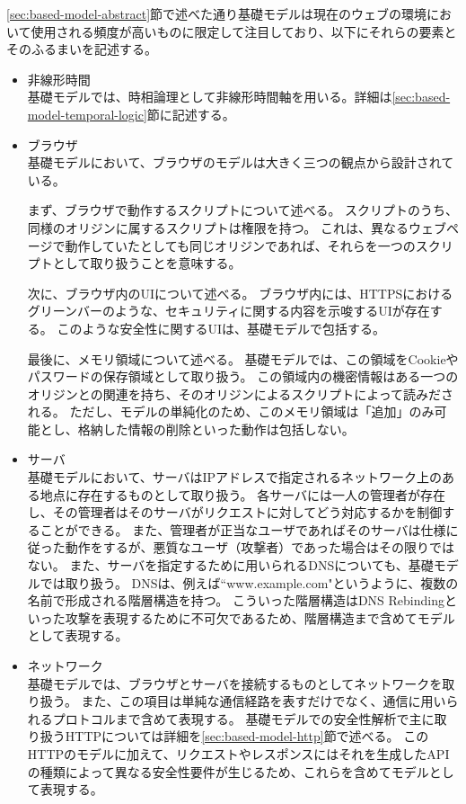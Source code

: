 \documentclass[12pt,a4paper]{jbook}
\begin{document}
\ref{sec:based-model-abstract}節で述べた通り基礎モデルは現在のウェブの環境において使用される頻度が高いものに限定して注目しており、以下にそれらの要素とそのふるまいを記述する。
\color{red}
\begin{itemize}
\item 非線形時間 \\
基礎モデルでは、時相論理として非線形時間軸を用いる。詳細は\ref{sec:based-model-temporal-logic}節に記述する。
\item ブラウザ \\
基礎モデルにおいて、ブラウザのモデルは大きく三つの観点から設計されている。

まず、ブラウザで動作するスクリプトについて述べる。
スクリプトのうち、同様のオリジンに属するスクリプトは権限を持つ。
これは、異なるウェブページで動作していたとしても同じオリジンであれば、それらを一つのスクリプトとして取り扱うことを意味する。

次に、ブラウザ内のUIについて述べる。
ブラウザ内には、HTTPSにおけるグリーンバーのような、セキュリティに関する内容を示唆するUIが存在する。
このような安全性に関するUIは、基礎モデルで包括する。

最後に、メモリ領域について述べる。
基礎モデルでは、この領域をCookieやパスワードの保存領域として取り扱う。
この領域内の機密情報はある一つのオリジンとの関連を持ち、そのオリジンによるスクリプトによって読みだされる。
ただし、モデルの単純化のため、このメモリ領域は「追加」のみ可能とし、格納した情報の削除といった動作は包括しない。
\item サーバ \\
基礎モデルにおいて、サーバはIPアドレスで指定されるネットワーク上のある地点に存在するものとして取り扱う。
各サーバには一人の管理者が存在し、その管理者はそのサーバがリクエストに対してどう対応するかを制御することができる。
また、管理者が正当なユーザであればそのサーバは仕様に従った動作をするが、悪質なユーザ（攻撃者）であった場合はその限りではない。
また、サーバを指定するために用いられるDNSについても、基礎モデルでは取り扱う。
DNSは、例えば``www.example.com"というように、複数の名前で形成される階層構造を持つ。
こういった階層構造はDNS Rebinding\cite{dns-rebinding}といった攻撃を表現するために不可欠であるため、階層構造まで含めてモデルとして表現する。
\item ネットワーク \\
基礎モデルでは、ブラウザとサーバを接続するものとしてネットワークを取り扱う。
また、この項目は単純な通信経路を表すだけでなく、通信に用いられるプロトコルまで含めて表現する。
基礎モデルでの安全性解析で主に取り扱うHTTPについては詳細を\ref{sec:based-model-http}節で述べる。
このHTTPのモデルに加えて、リクエストやレスポンスにはそれを生成したAPIの種類によって異なる安全性要件が生じるため、これらを含めてモデルとして表現する。
\end{itemize}
\color{black}
\end{document}
